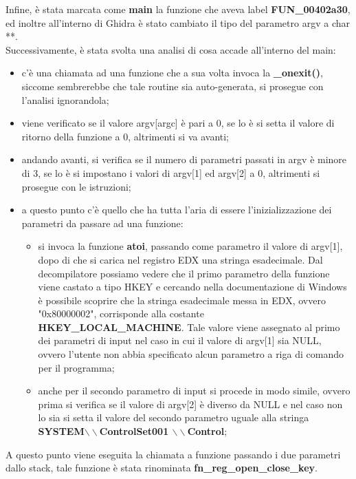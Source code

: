 \documentclass[12pt]{extarticle}
\begin{document}
Infine, è stata marcata come \textbf{main} la funzione che aveva label \textbf{FUN\_00402a30}, ed inoltre all'interno di Ghidra è stato cambiato il tipo del parametro argv a \textsf{char **}.\\ Successivamente, è stata svolta una analisi di cosa accade all'interno del main:
\begin{itemize}
\item c'è una chiamata ad una funzione che a sua volta invoca la \textbf{\_onexit()}, siccome sembrerebbe che tale routine sia auto-generata, si prosegue con l'analisi ignorandola;
\item viene verificato se il valore \textsf{argv[argc]} è pari a 0, se lo è si setta il valore di ritorno della funzione a 0, altrimenti si va avanti;
\item andando avanti, si verifica se il numero di parametri passati in argv è minore di 3, se lo è si impostano i valori di \textsf{argv[1]} ed \textsf{argv[2]} a 0, altrimenti si prosegue con le istruzioni;
\item a questo punto c'è quello che ha tutta l'aria di essere l'inizializzazione dei parametri da passare ad una funzione:
\begin{itemize}
\item si invoca la funzione \textbf{atoi}, passando come parametro il valore di argv[1], dopo di che si carica nel registro EDX una stringa esadecimale. Dal decompilatore possiamo vedere che il primo parametro della funzione viene castato a tipo HKEY e cercando nella documentazione di 	Windows è possibile scoprire che la stringa esadecimale messa in EDX, ovvero "0x80000002", corrisponde alla costante \textbf{HKEY\_LOCAL\_MACHINE}. Tale valore viene assegnato al primo dei parametri di input nel caso in cui il valore di argv[1] sia NULL, ovvero l'utente non abbia specificato alcun parametro a riga di comando per il programma;
\item anche per il secondo parametro di input si procede in modo simile, ovvero prima si verifica se il valore di \textsf{argv[2]} è diverso da NULL e nel caso non lo sia si setta il valore del secondo parametro uguale alla stringa \textbf{SYSTEM$\backslash\backslash$ControlSet001
$\backslash\backslash$Control};
\end{itemize}
\end{itemize}
A questo punto viene eseguita la chiamata a funzione passando i due parametri dallo stack, tale funzione è stata rinominata \textbf{fn\_reg\_open\_close\_key}.
\end{document}
